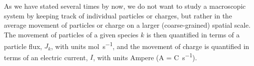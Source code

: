 



\section{}
\label{sec:Basics:Current} 
As we have stated several times by now, we do not want to study a macroscopic system by keeping track of individual particles or charges, but rather in the average movement of particles or charge on a larger (coarse-grained) spatial scale. The movement of particles of a given species $k$ is then quantified in terms of a particle flux, $J_k$, with units \si{\mole\per\second}, and the movement of charge is quantified in terms of an electric current, $I$, with units Ampere (\si{\ampere} = \si{\coulomb\per\second}). 

